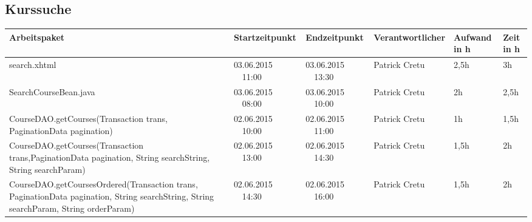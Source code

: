 \begin{landscape}
	\subsection{Kurssuche}
\begin{tabular}{|p{10.3cm}|p{3.2cm}|p{3.2cm}|p{3.5cm}|p{1.7cm}|p{1.5cm}|}
	\hline  \textbf{Arbeitspaket} & \textbf{Startzeitpunkt} & \textbf{Endzeitpunkt} & \textbf{Verantwortlicher}  & \textbf{Aufwand in h} & \textbf{Zeit in h}\\ 
		\hline   search.xhtml                                         & 03.06.2015 \ \ 11:00        & 03.06.2015 \ \ 13:30         & Patrick Cretu &  2,5h    & 3h\\ 
		\hline   SearchCourseBean.java                                & 03.06.2015 \ \ 08:00        & 03.06.2015 \ \ 10:00         & Patrick Cretu &  2h      & 2,5h \\
		\hline   CourseDAO.getCourses(Transaction trans, PaginationData pagination)    & 02.06.2015 \ \ 10:00        & 02.06.2015 \ \ 11:00     & Patrick Cretu &  1h   & 1,5h\\ 
		\hline  CourseDAO.getCourses(Transaction trans,PaginationData pagination, String searchString, String searchParam)& 02.06.2015 \ \ 13:00        & 02.06.2015 \ \ 14:30    & Patrick Cretu  &  1,5h         &  2h\\ 
		\hline  CourseDAO.getCoursesOrdered(Transaction trans, PaginationData pagination, String searchString, String searchParam, String orderParam)   & 02.06.2015 \ \ 14:30        & 02.06.2015 \ \ 16:00       & Patrick Cretu &  1,5h    &    2h       \\ 
		\hline 
	\end{tabular} \ \\
	\ \\
\end{landscape}



